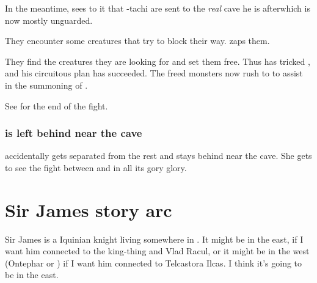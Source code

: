 In the meantime, \Criseis{} sees to it that \Dzasselid-tachi are sent to the \emph{real} cave he is after\dash which is now mostly unguarded. 

They encounter some creatures that try to block their way. 
\Criseis{} zaps them.


They find the creatures they are looking for and set them free. Thus \Ishnaruchaefir{} has tricked \Teshrial{}, and his circuitous plan has succeeded. The freed monsters now rush to \Malcur to assist in the summoning of \Nithdornazsh. 

See  for the end of the fight.






\subsubsection{\Shilred{} is left behind near the cave}
\Shilred{} accidentally gets separated from the rest and stays behind near the cave. 
She gets to see the fight between \Ishnaruchaefir{} and \Teshrial{} in all its gory glory. 















\section{Sir James story arc}
Sir James is a \human{} Iquinian knight living somewhere in \Velcad{}. 
It might be in the east, if I want him connected to the king-thing and Vlad Racul, or it might be in the west (Ontephar or \Scyrum) if I want him connected to Telcastora Ilcas. 
I think it's going to be in the east. 

